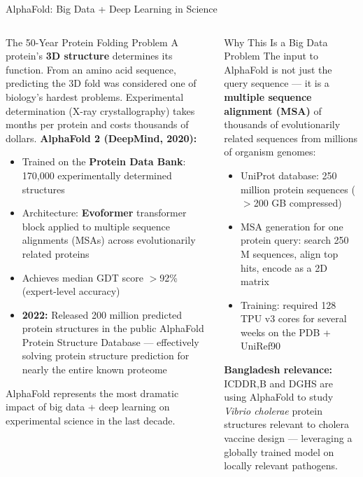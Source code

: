\documentclass[aspectratio=169,10pt]{beamer}
\begin{document}
\begin{frame}{AlphaFold: Big Data + Deep Learning in Science}
  \begin{columns}[T]
      \begin{block}{The 50-Year Protein Folding Problem}
        A protein's \textbf{3D structure} determines its function.  From an amino acid sequence, predicting the 3D fold was considered one of biology's hardest problems.  Experimental determination (X-ray crystallography) takes months per protein and costs thousands of dollars.
        \vspace{4pt}
        \textbf{AlphaFold 2 (DeepMind, 2020):}
        \begin{itemize}
          \item Trained on the \textbf{Protein Data Bank}: 170{,}000 experimentally determined structures
          \item Architecture: \textbf{Evoformer} transformer block applied to multiple sequence alignments (MSAs) across evolutionarily related proteins
          \item Achieves median GDT score $>$92\% (expert-level accuracy)
          \item \textbf{2022:} Released 200 million predicted protein structures in the public AlphaFold Protein Structure Database --- effectively solving protein structure prediction for nearly the entire known proteome
        \end{itemize}
        AlphaFold represents the most dramatic impact of big data + deep learning on experimental science in the last decade.
      \end{block}

      \begin{exampleblock}{Why This Is a Big Data Problem}
        \small The input to AlphaFold is not just the query sequence --- it is a \textbf{multiple sequence alignment (MSA)} of thousands of evolutionarily related sequences from millions of organism genomes:
        \begin{itemize}
          \item UniProt database: 250 million protein sequences ($>$200 GB compressed)
          \item MSA generation for one protein query: search 250 M sequences, align top hits, encode as a 2D matrix
          \item Training: required 128 TPU v3 cores for several weeks on the PDB + UniRef90
        \end{itemize}
        \vspace{4pt}
        \textbf{Bangladesh relevance:} ICDDR,B and DGHS are using AlphaFold to study \textit{Vibrio cholerae} protein structures relevant to cholera vaccine design --- leveraging a globally trained model on locally relevant pathogens.
      \end{exampleblock}
  \end{columns}
\end{frame}
\end{document}
